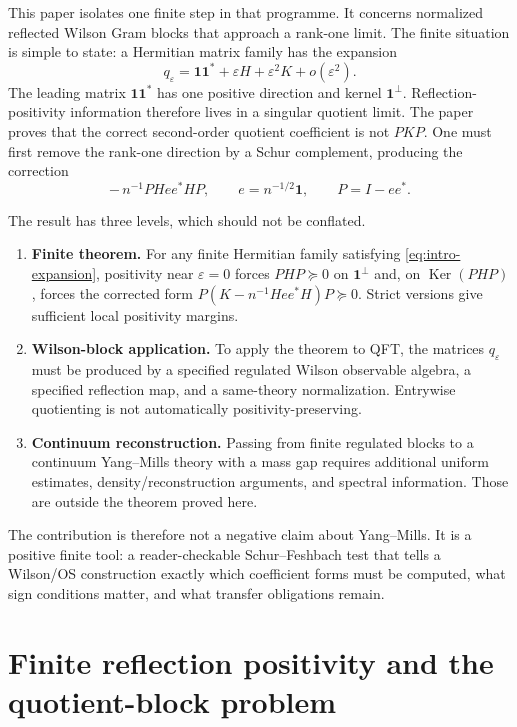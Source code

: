 \documentclass[11pt]{article}
\newcommand{\one}{\mathbf 1}
\newcommand{\eps}{\varepsilon}
\newcommand{\Ker}{\operatorname{Ker}}
\begin{document}
This paper isolates one finite step in that programme.  It concerns normalized reflected Wilson Gram blocks that approach a rank-one limit.  The finite situation is simple to state: a Hermitian matrix family has the expansion
\begin{equation}
  q_\eps=\one\one^*+\eps H+\eps^2K+o(\eps^2).
  \label{eq:intro-expansion}
\end{equation}
The leading matrix \(\one\one^*\) has one positive direction and kernel \(\one^\perp\).  Reflection-positivity information therefore lives in a singular quotient limit.  The paper proves that the correct second-order quotient coefficient is not \(PKP\).  One must first remove the rank-one direction by a Schur complement, producing the correction
\begin{equation}
  -\,n^{-1}PHee^*HP,
  \qquad e=n^{-1/2}\one,
  \qquad P=I-ee^*.
  \label{eq:intro-correction}
\end{equation}

The result has three levels, which should not be conflated.
\begin{enumerate}[label=(L\arabic*)]
  \item \textbf{Finite theorem.}  For any finite Hermitian family satisfying \eqref{eq:intro-expansion}, positivity near \(\eps=0\) forces \(PHP\succeq0\) on \(\one^\perp\) and, on \(\Ker(PHP)\), forces the corrected form \(P(K-n^{-1}Hee^*H)P\succeq0\).  Strict versions give sufficient local positivity margins.
  \item \textbf{Wilson-block application.}  To apply the theorem to QFT, the matrices \(q_\eps\) must be produced by a specified regulated Wilson observable algebra, a specified reflection map, and a same-theory normalization.  Entrywise quotienting is not automatically positivity-preserving.
  \item \textbf{Continuum reconstruction.}  Passing from finite regulated blocks to a continuum Yang--Mills theory with a mass gap requires additional uniform estimates, density/reconstruction arguments, and spectral information.  Those are outside the theorem proved here.
\end{enumerate}

The contribution is therefore not a negative claim about Yang--Mills.  It is a positive finite tool: a reader-checkable Schur--Feshbach test that tells a Wilson/OS construction exactly which coefficient forms must be computed, what sign conditions matter, and what transfer obligations remain.

\section{Finite reflection positivity and the quotient-block problem}
\end{document}
